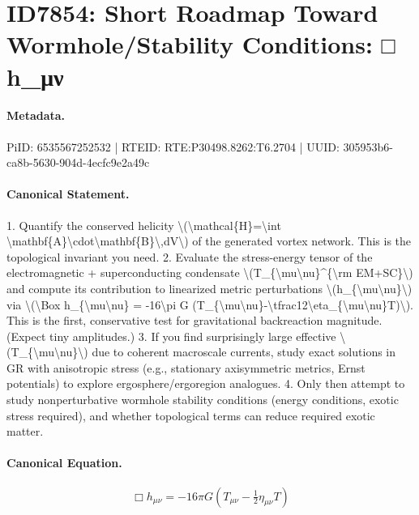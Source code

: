 \section*{ID7854: Short Roadmap Toward Wormhole/Stability Conditions: □ h\_μν}
\paragraph{Metadata.}
PiID: 6535567252532 | RTEID: RTE:P30498.8262:T6.2704 | UUID: 305953b6-ca8b-5630-904d-4ecfc9e2a49c

\paragraph{Canonical Statement.}
1. Quantify the conserved helicity \textbackslash{}(\textbackslash{}mathcal\{H\}=\textbackslash{}int \textbackslash{}mathbf\{A\}\textbackslash{}cdot\textbackslash{}mathbf\{B\}\textbackslash{},dV\textbackslash{}) of the generated vortex network. This is the topological invariant you need. 2. Evaluate the stress-energy tensor of the electromagnetic + superconducting condensate \textbackslash{}(T\_\{\textbackslash{}mu\textbackslash{}nu\}\textasciicircum{}\{\textbackslash{}rm EM+SC\}\textbackslash{}) and compute its contribution to linearized metric perturbations \textbackslash{}(h\_\{\textbackslash{}mu\textbackslash{}nu\}\textbackslash{}) via \textbackslash{}(\textbackslash{}Box h\_\{\textbackslash{}mu\textbackslash{}nu\} = -16\textbackslash{}pi G (T\_\{\textbackslash{}mu\textbackslash{}nu\}-\textbackslash{}tfrac12\textbackslash{}eta\_\{\textbackslash{}mu\textbackslash{}nu\}T)\textbackslash{}). This is the first, conservative test for gravitational backreaction magnitude. (Expect tiny amplitudes.) 3. If you find surprisingly large effective \textbackslash{}(T\_\{\textbackslash{}mu\textbackslash{}nu\}\textbackslash{}) due to coherent macroscale currents, study exact solutions in GR with anisotropic stress (e.g., stationary axisymmetric metrics, Ernst potentials) to explore ergosphere/ergoregion analogues. 4. Only then attempt to study nonperturbative wormhole stability conditions (energy conditions, exotic stress required), and whether topological terms can reduce required exotic matter.

\paragraph{Canonical Equation.}
\[
\Box h_{\mu\nu} = -16\pi G (T_{\mu\nu}-\tfrac12\eta_{\mu\nu}T)
\]

